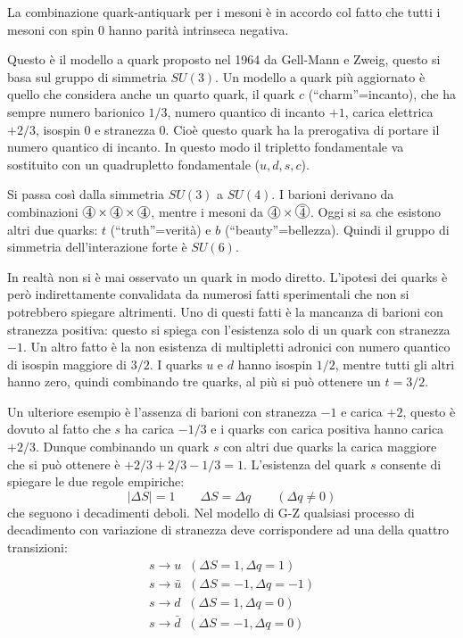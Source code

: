 La combinazione quark-antiquark per i mesoni è in accordo col fatto che tutti 
i mesoni con spin $0$ hanno parità
intrinseca negativa.

Questo è il modello a quark proposto nel 1964 da Gell-Mann e Zweig, questo si 
basa sul gruppo di simmetria
$SU(3)$. Un modello a quark più aggiornato è quello che considera anche un 
quarto quark, il quark $c$
(``charm''=incanto),
che ha sempre numero barionico $1/3$, numero quantico di incanto $+1$, carica 
elettrica $+2/3$, isospin $0$ e stranezza $0$.
Cioè questo quark ha la prerogativa di portare il numero quantico di incanto. 
In questo modo il tripletto
fondamentale va sostituito con un quadrupletto fondamentale ($u,d,s,c$).

Si passa così dalla simmetria $SU(3)$ a $SU(4)$. I barioni derivano da 
combinazioni
$\Ci{4}\times\Ci{4}\times\Ci{4}$, mentre i mesoni da 
$\Ci{4}\times\Ci{$\bar{4}$}$.
Oggi si sa che esistono altri due quarks: $t$ (``truth''=verità) e $b$ 
(``beauty''=bellezza).
Quindi il gruppo di simmetria dell'interazione forte è $SU(6)$.

In realtà non si è mai osservato un quark in modo diretto. L'ipotesi dei 
quarks è però indirettamente convalidata
da numerosi fatti sperimentali che non si potrebbero spiegare altrimenti.
Uno di questi fatti è la mancanza di barioni con stranezza positiva: questo si 
spiega con l'esistenza solo di un
quark con stranezza $-1$.
Un altro fatto è la non esistenza di multipletti adronici con numero quantico 
di isospin maggiore di $3/2$.
I quarks $u$ e $d$ hanno isospin $1/2$, mentre tutti gli altri hanno zero, 
quindi combinando tre quarks, al più si
può ottenere un $t=3/2$.

Un ulteriore esempio è l'assenza di barioni con stranezza $-1$ e carica $+2$, 
questo è dovuto al fatto che $s$ ha
carica $-1/3$ e i quarks con carica positiva hanno carica $+2/3$.
Dunque combinando un quark $s$ con altri due quarks la carica maggiore che si 
può ottenere è $+2/3+2/3-1/3=1$.
L'esistenza del quark $s$ consente di spiegare le due regole empiriche:
\[
|\Delta S|=1\qquad \Delta S=\Delta q\qquad (\Delta q\neq 0) 
\]
che seguono i decadimenti deboli.
Nel modello di G-Z qualsiasi processo di decadimento con variazione di 
stranezza deve corrispondere ad una
della quattro transizioni:
\begin{gather}
s\rightarrow u\;\;(\Delta S=1,\Delta q=1)\\
s\rightarrow \bar{u}\;\;(\Delta S=-1,\Delta q=-1)\\
s\rightarrow d\;\;(\Delta S=1,\Delta q=0)\\
s\rightarrow \bar{d}\;\;(\Delta S=-1,\Delta q=0)
\end{gather}

